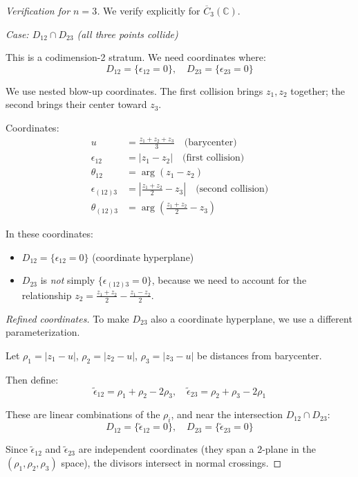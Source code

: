\begin{proof}[Verification for $n=3$]
We verify explicitly for $\overline{C}_3(\mathbb{C})$.

\emph{Case: $D_{12} \cap D_{23}$ (all three points collide)}

This is a codimension-2 stratum. We need coordinates where:
\[D_{12} = \{\epsilon_{12} = 0\}, \quad D_{23} = \{\epsilon_{23} = 0\}\]

We use nested blow-up coordinates. The first collision brings $z_1, z_2$ together;
the second brings their center toward $z_3$.

Coordinates:
\begin{align}
u &= \frac{z_1 + z_2 + z_3}{3} \quad \text{(barycenter)}\\
\epsilon_{12} &= |z_1 - z_2| \quad \text{(first collision)}\\
\theta_{12} &= \arg(z_1 - z_2)\\
\epsilon_{(12)3} &= \left| \frac{z_1 + z_2}{2} - z_3 \right| \quad \text{(second collision)}\\
\theta_{(12)3} &= \arg\left(\frac{z_1 + z_2}{2} - z_3\right)
\end{align}

In these coordinates:
\begin{itemize}
\item $D_{12} = \{\epsilon_{12} = 0\}$ (coordinate hyperplane)
\item $D_{23}$ is \emph{not} simply $\{\epsilon_{(12)3} = 0\}$, because we need to account
for the relationship $z_2 = \frac{z_1 + z_2}{2} - \frac{z_1 - z_2}{2}$.
\end{itemize}

\emph{Refined coordinates.}
To make $D_{23}$ also a coordinate hyperplane, we use a different parameterization.

Let $\rho_1 = |z_1 - u|$, $\rho_2 = |z_2 - u|$, $\rho_3 = |z_3 - u|$ be distances from barycenter.

Then define:
\[\tilde{\epsilon}_{12} = \rho_1 + \rho_2 - 2\rho_3, \quad 
\tilde{\epsilon}_{23} = \rho_2 + \rho_3 - 2\rho_1\]

These are linear combinations of the $\rho_i$, and near the intersection $D_{12} \cap D_{23}$:
\[D_{12} = \{\tilde{\epsilon}_{12} = 0\}, \quad D_{23} = \{\tilde{\epsilon}_{23} = 0\}\]

Since $\tilde{\epsilon}_{12}$ and $\tilde{\epsilon}_{23}$ are independent coordinates
(they span a 2-plane in the $(\rho_1, \rho_2, \rho_3)$ space), the divisors intersect in
normal crossings. \checkmark
\end{proof}

